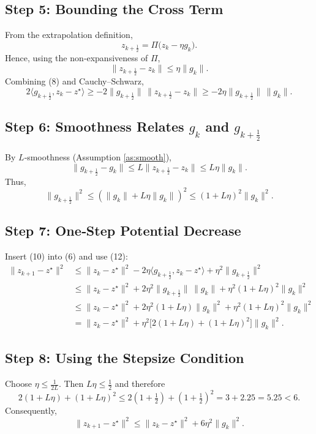 \documentclass{article}
\begin{document}
\subsection*{Step 5: Bounding the Cross Term}
From the extrapolation definition,
\[
z_{k+\frac12}= \Pi\!\bigl(z_{k}-\eta g_{k}\bigr).
\]
Hence, using the non‑expansiveness of $\Pi$,
\[
\|z_{k+\frac12}-z_{k}\|\le \eta\|g_{k}\|. \tag{9}
\]
Combining (8) and Cauchy–Schwarz,
\[
2\langle g_{k+\frac12},z_{k}-z^{\star}\rangle
\ge -2\|g_{k+\frac12}\|\,\|z_{k+\frac12}-z_{k}\|
\ge -2\eta\|g_{k+\frac12}\|\,\|g_{k}\| . \tag{10}
\]

\subsection*{Step 6: Smoothness Relates $g_{k}$ and $g_{k+\frac12}$}
By $L$‑smoothness (Assumption \ref{as:smooth}),
\[
\|g_{k+\frac12}-g_{k}\|\le L\|z_{k+\frac12}-z_{k}\|\le L\eta\|g_{k}\|. \tag{11}
\]
Thus,
\[
\|g_{k+\frac12}\|^{2}\le (\|g_{k}\|+L\eta\|g_{k}\|)^{2}
\le (1+L\eta)^{2}\|g_{k}\|^{2}. \tag{12}
\]

\subsection*{Step 7: One‑Step Potential Decrease}
Insert (10) into (6) and use (12):
\[
\begin{aligned}
\|z_{k+1}-z^{\star}\|^{2}
&\le \|z_{k}-z^{\star}\|^{2}
-2\eta\langle g_{k+\frac12},z_{k}-z^{\star}\rangle
+\eta^{2}\|g_{k+\frac12}\|^{2}\\[1mm]
&\le \|z_{k}-z^{\star}\|^{2}
+2\eta^{2}\|g_{k+\frac12}\|\,\|g_{k}\|
+\eta^{2}(1+L\eta)^{2}\|g_{k}\|^{2}\\[1mm]
&\le \|z_{k}-z^{\star}\|^{2}
+2\eta^{2}(1+L\eta)\|g_{k}\|^{2}
+\eta^{2}(1+L\eta)^{2}\|g_{k}\|^{2}\\[1mm]
&= \|z_{k}-z^{\star}\|^{2}
+\eta^{2}\bigl[2(1+L\eta)+(1+L\eta)^{2}\bigr]\|g_{k}\|^{2}. \tag{13}
\end{aligned}
\]

\subsection*{Step 8: Using the Stepsize Condition}
Choose $\eta\le \frac{1}{2L}$.
Then $L\eta\le \frac12$ and therefore
\[
2(1+L\eta)+(1+L\eta)^{2}
\le 2\!\left(1+\tfrac12\right)+\!\left(1+\tfrac12\right)^{2}
=3+2.25=5.25<6. \tag{14}
\]
Consequently,
\[
\|z_{k+1}-z^{\star}\|^{2}
\le \|z_{k}-z^{\star}\|^{2}+6\eta^{2}\|g_{k}\|^{2}. \tag{15}
\]
\end{document}
